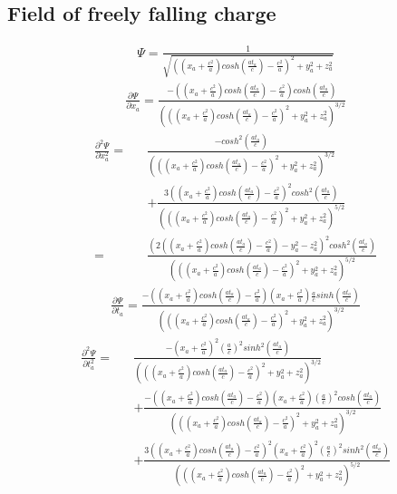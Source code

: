 \documentclass[prd,showpacs,preprint]{revtex4-1}
\begin{document}
\begin{appendix}
\section{Field of freely falling charge\label{app:Psi_Free_Fall}}
\begin{eqnarray}
\Psi=\frac{1}{\sqrt{((x_a+\frac{c^2}{a})cosh(\frac{at_a}{c})-\frac{c^2}{a})^2+y_a^2+z_a^2}}
\label{app:eqn:Psi_Free_Fall}
\end{eqnarray}
\begin{eqnarray}
\frac{\partial \Psi}{\partial x_a}=\frac{-((x_a+\frac{c^2}{a})cosh(\frac{at_a}{c})-\frac{c^2}{a})cosh(\frac{at_a}{c})}{(((x_a+\frac{c^2}{a})cosh(\frac{at_a}{c})-\frac{c^2}{a})^2+y_a^2+z_a^2)^{3/2}}
\end{eqnarray}
\begin{eqnarray}
\frac{\partial^2 \Psi}{\partial x_a^2}=&&\frac{-cosh^2(\frac{at_a}{c})}{(((x_a+\frac{c^2}{a})cosh(\frac{at_a}{c})-\frac{c^2}{a})^2+y_a^2+z_a^2)^{3/2}}\nonumber\\
&&+\frac{3((x_a+\frac{c^2}{a})cosh(\frac{at_a}{c})-\frac{c^2}{a})^2cosh^2(\frac{at_a}{c})}{(((x_a+\frac{c^2}{a})cosh(\frac{at_a}{c})-\frac{c^2}{a})^2+y_a^2+z_a^2)^{5/2}}\nonumber\\
=&&\frac{(2((x_a+\frac{c^2}{a})cosh(\frac{at_a}{c})-\frac{c^2}{a})-y_a^2-z_a^2)^2cosh^2(\frac{at_a}{c})}{(((x_a+\frac{c^2}{a})cosh(\frac{at_a}{c})-\frac{c^2}{a})^2+y_a^2+z_a^2)^{5/2}}
\end{eqnarray}
\begin{eqnarray}
\frac{\partial \Psi}{\partial t_a}=\frac{-((x_a+\frac{c^2}{a})cosh(\frac{at_a}{c})-\frac{c^2}{a})(x_a+\frac{c^2}{a})\frac{a}{c}sinh(\frac{at_a}{c})}{(((x_a+\frac{c^2}{a})cosh(\frac{at_a}{c})-\frac{c^2}{a})^2+y_a^2+z_a^2)^{3/2}}
\end{eqnarray}
\begin{eqnarray}
\frac{\partial^2 \Psi}{\partial t_a^2}=&&\frac{-(x_a+\frac{c^2}{a})^2(\frac{a}{c})^2sinh^2(\frac{at_a}{c})}{(((x_a+\frac{c^2}{a})cosh(\frac{at_a}{c})-\frac{c^2}{a})^2+y_a^2+z_a^2)^{3/2}}\nonumber\\
&&+\frac{-((x_a+\frac{c^2}{a})cosh(\frac{at_a}{c})-\frac{c^2}{a})(x_a+\frac{c^2}{a})(\frac{a}{c})^2cosh(\frac{at_a}{c})}{(((x_a+\frac{c^2}{a})cosh(\frac{at_a}{c})-\frac{c^2}{a})^2+y_a^2+z_a^2)^{3/2}}\nonumber\\
&&+\frac{3((x_a+\frac{c^2}{a})cosh(\frac{at_a}{c})-\frac{c^2}{a})^2(x_a+\frac{c^2}{a})^2(\frac{a}{c})^2sinh^2(\frac{at_a}{c})}{(((x_a+\frac{c^2}{a})cosh(\frac{at_a}{c})-\frac{c^2}{a})^2+y_a^2+z_a^2)^{5/2}}\nonumber\\

\end{eqnarray}
\end{appendix}
\end{document}
